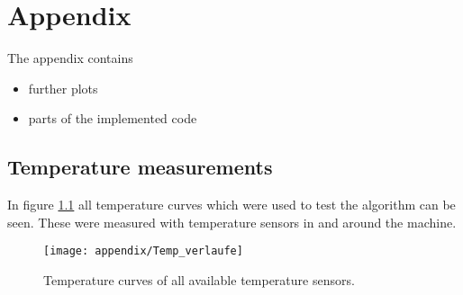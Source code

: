 \chapter{Appendix}
\label{apx:appendix}

The appendix contains 

\begin{itemize}
\item further plots
\item parts of the implemented code
\end{itemize}

\section{Temperature measurements}
\label{apx:Temp_meas}

In figure \ref{apx:Temp_meas} all temperature curves which were used to test the algorithm can be seen. These were measured with temperature sensors in and around the machine. 



\begin{figure}[!htb]
    \centering
    \texttt{[image: appendix/Temp\_verlaufe]} %
    \caption[Temperature curves]{Temperature curves of all available temperature sensors.}
    \label{fig:Temps_all}
\end{figure}

